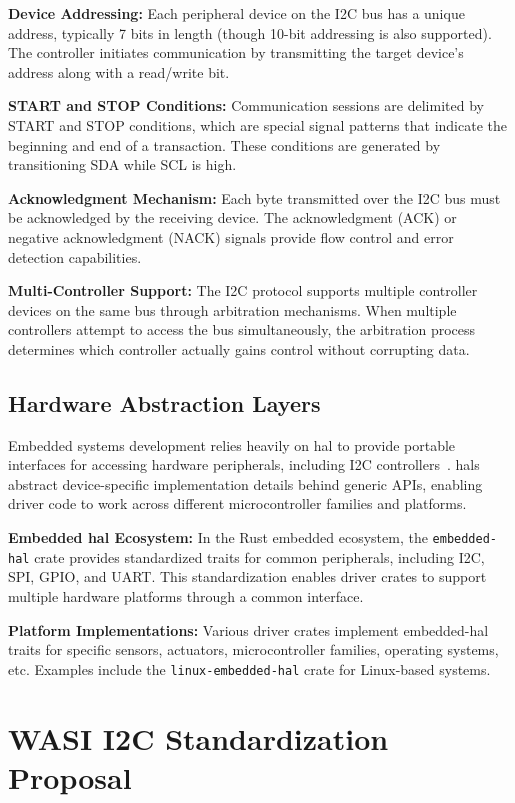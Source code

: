 \textbf{Device Addressing:} Each peripheral device on the I2C bus has a unique address, typically 7 bits in length (though 10-bit addressing is also supported). The controller initiates communication by transmitting the target device's address along with a read/write bit.

\textbf{START and STOP Conditions:} Communication sessions are delimited by START and STOP conditions, which are special signal patterns that indicate the beginning and end of a transaction. These conditions are generated by transitioning SDA while SCL is high.

\textbf{Acknowledgment Mechanism:} Each byte transmitted over the I2C bus must be acknowledged by the receiving device. The acknowledgment (ACK) or negative acknowledgment (NACK) signals provide flow control and error detection capabilities.

\textbf{Multi-Controller Support:} The I2C protocol supports multiple controller devices on the same bus through arbitration mechanisms. When multiple controllers attempt to access the bus simultaneously, the arbitration process determines which controller actually gains control without corrupting data.

\subsection{Hardware Abstraction Layers}
\label{subsec:hal-embedded}

Embedded systems development relies heavily on \acrfull{hal} to provide portable interfaces for accessing hardware peripherals, including I2C controllers~\cite{hal}. \acrshort{hal}s abstract device-specific implementation details behind generic APIs, enabling driver code to work across different microcontroller families and platforms.

\textbf{Embedded \acrshort{hal} Ecosystem:} In the Rust embedded ecosystem, the \texttt{embedded-hal} crate provides standardized traits for common peripherals, including I2C, SPI, GPIO, and UART. This standardization enables driver crates to support multiple hardware platforms through a common interface.

\textbf{Platform Implementations:} Various driver crates implement embedded-hal traits for specific sensors, actuators, microcontroller families, operating systems, etc. Examples include the \texttt{linux-embedded-hal} crate for Linux-based systems.

\section{WASI I2C Standardization Proposal}
\label{sec:wasi-i2c-proposal}

